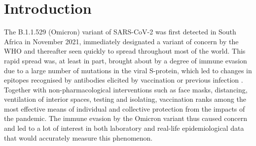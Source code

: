 \documentclass[preprint,12pt,authoryear]{elsarticle}
\begin{document}

\section{Introduction}
\label{sec1}

The B.1.1.529 (Omicron) variant of SARS-CoV-2 was first detected in South Africa in November 2021, immediately designated a variant of concern by the WHO \citep{who2021omicron} and  thereafter seen quickly to spread throughout most of the world. This rapid spread was, at least in part, brought about by a degree of immune evasion due to a large number of mutations in the viral S-protein, which led to changes in epitopes recognised by antibodies elicited by vaccination or previous infection \citep{mccallum2022}. Together with non-pharmacological interventions such as face masks, distancing, ventilation of interior spaces, testing and isolating, vaccination ranks among the most effective means of individual and collective protection from the impacts of the pandemic. The immune evasion by the Omicron variant thus caused concern and led to a lot of interest in both laboratory and real-life epidemiological data that would accurately measure this phenomenon.


\end{document}
